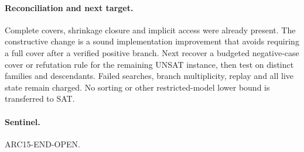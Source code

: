 \documentclass{article}
\begin{document}
\paragraph{Reconciliation and next target.}
Complete covers, shrinkage closure and implicit access were already present.
The constructive change is a sound implementation improvement that avoids
requiring a full cover after a verified positive branch.
Next recover a budgeted negative-case cover or refutation rule for the
remaining UNSAT instance, then test on distinct families and descendants.
Failed searches, branch multiplicity, replay and all live state remain charged.
No sorting or other restricted-model lower bound is transferred to SAT.
\paragraph{Sentinel.} ARC15-END-OPEN.
\end{document}
